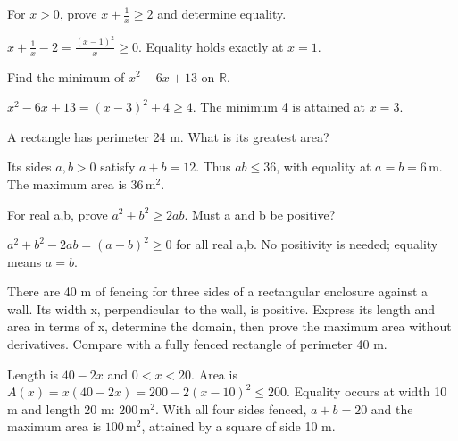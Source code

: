 \documentclass[11pt]{article}
\begin{document}
For \(x>0\), prove \(x+\frac{1}{x}\geq 2\) and determine equality.\par
\(x+\frac{1}{x}-2=\frac{(x-1)^{2}}{x}\geq 0\). Equality holds exactly at \(x=1\).\par
{}
Find the minimum of \(x^{2}-6x+13\) on \(\mathbb{R}\).\par
\(x^{2}-6x+13=(x-3)^{2}+4\geq 4\). The minimum 4 is attained at \(x=3\).\par
{}
A rectangle has perimeter 24 m. What is its greatest area?\par
Its sides \(a,b>0\) satisfy \(a+b=12\). Thus \(ab\leq 36\), with equality at \(a=b=6\,\mathrm{m}\). The maximum area is \(36\,\mathrm{m}^{2}\).\par
{}
For real a,b, prove \(a^{2}+b^{2}\geq 2ab\). Must a and b be positive?\par
\(a^{2}+b^{2}-2ab=(a-b)^{2}\geq 0\) for all real a,b. No positivity is needed; equality means \(a=b\).\par
{}
There are 40 m of fencing for three sides of a rectangular enclosure against a wall. Its width x, perpendicular to the wall, is positive. Express its length and area in terms of x, determine the domain, then prove the maximum area without derivatives. Compare with a fully fenced rectangle of perimeter 40 m.\par
Length is \(40-2x\) and \(0<x<20\). Area is \(A(x)=x(40-2x)=200-2(x-10)^{2}\leq 200\). Equality occurs at width 10 m and length 20 m: \(200\,\mathrm{m}^{2}\). With all four sides fenced, \(a+b=20\) and the maximum area is \(100\,\mathrm{m}^{2}\), attained by a square of side 10 m.\par
\end{document}
